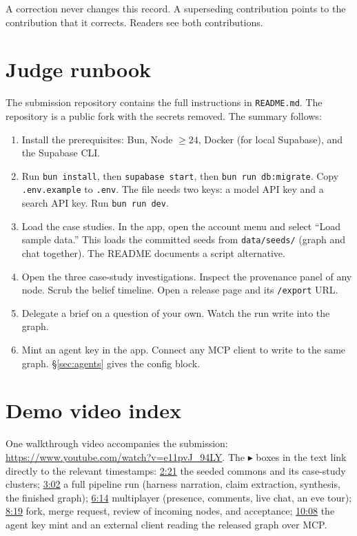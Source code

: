 \documentclass[10pt,twocolumn]{article}
\newcommand{\code}[1]{\texttt{\small #1}}
\begin{document}
A correction never changes this record. A superseding contribution points
to the contribution that it corrects. Readers see both contributions.

\section{Judge runbook}
\label{app:runbook}

The submission repository contains the full instructions in
\code{README.md}. The repository is a public fork with the secrets
removed. The summary follows:

\begin{enumerate}
\item Install the prerequisites: Bun, Node $\geq 24$, Docker (for local
  Supabase), and the Supabase CLI.
\item Run \code{bun install}, then \code{supabase start}, then
  \code{bun run db:migrate}. Copy \code{.env.example} to \code{.env}.
  The file needs two keys: a model API key and a search API key. Run
  \code{bun run dev}.
\item Load the case studies. In the app, open the account menu and
  select ``Load sample data.'' This loads the committed seeds from
  \code{data/seeds/} (graph and chat together). The README documents a
  script alternative.
\item Open the three case-study investigations. Inspect the provenance
  panel of any node. Scrub the belief timeline. Open a release page and
  its \code{/export} URL.
\item Delegate a brief on a question of your own. Watch the run write
  into the graph.
\item Mint an agent key in the app. Connect any MCP client to write to
  the same graph. \S\ref{sec:agents} gives the config block.
\end{enumerate}

\section{Demo video index}
\label{app:video}

One walkthrough video accompanies the submission:
\url{https://www.youtube.com/watch?v=e11pvJ_94LY}. The
$\blacktriangleright$ boxes in the text link directly to the relevant
timestamps:
\href{https://youtu.be/e11pvJ_94LY?t=141}{2:21} the seeded commons and
its case-study clusters;
\href{https://youtu.be/e11pvJ_94LY?t=182}{3:02} a full pipeline run
(harness narration, claim extraction, synthesis, the finished graph);
\href{https://youtu.be/e11pvJ_94LY?t=374}{6:14} multiplayer (presence,
comments, live chat, an eve tour);
\href{https://youtu.be/e11pvJ_94LY?t=499}{8:19} fork, merge request,
review of incoming nodes, and acceptance;
\href{https://youtu.be/e11pvJ_94LY?t=608}{10:08} the agent key mint and
an external client reading the released graph over MCP.
\end{document}
